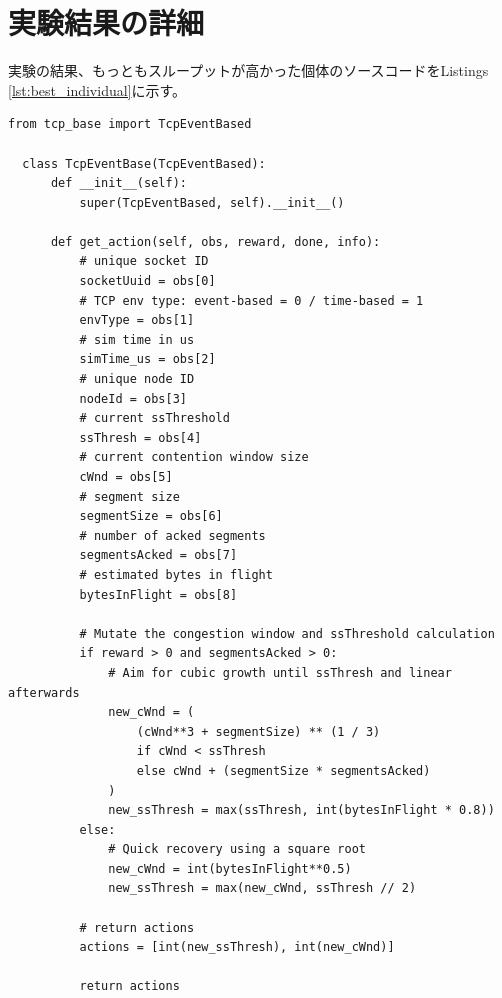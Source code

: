 \documentclass[a4paper,11pt]{jreport}
\begin{document}
\chapter{実験結果の詳細}
\label{appendix:experiment-result}
実験の結果、もっともスループットが高かった個体のソースコードをListings \ref{lst:best_individual}に示す。
\begin{lstlisting}[caption=最もスループットが高かった個体のソースコード,label=lst:best_individual]
  from tcp_base import TcpEventBased

  class TcpEventBase(TcpEventBased):
      def __init__(self):
          super(TcpEventBased, self).__init__()

      def get_action(self, obs, reward, done, info):
          # unique socket ID
          socketUuid = obs[0]
          # TCP env type: event-based = 0 / time-based = 1
          envType = obs[1]
          # sim time in us
          simTime_us = obs[2]
          # unique node ID
          nodeId = obs[3]
          # current ssThreshold
          ssThresh = obs[4]
          # current contention window size
          cWnd = obs[5]
          # segment size
          segmentSize = obs[6]
          # number of acked segments
          segmentsAcked = obs[7]
          # estimated bytes in flight
          bytesInFlight = obs[8]

          # Mutate the congestion window and ssThreshold calculation
          if reward > 0 and segmentsAcked > 0:
              # Aim for cubic growth until ssThresh and linear afterwards
              new_cWnd = (
                  (cWnd**3 + segmentSize) ** (1 / 3)
                  if cWnd < ssThresh
                  else cWnd + (segmentSize * segmentsAcked)
              )
              new_ssThresh = max(ssThresh, int(bytesInFlight * 0.8))
          else:
              # Quick recovery using a square root
              new_cWnd = int(bytesInFlight**0.5)
              new_ssThresh = max(new_cWnd, ssThresh // 2)

          # return actions
          actions = [int(new_ssThresh), int(new_cWnd)]

          return actions
  \end{lstlisting}
\end{document}

